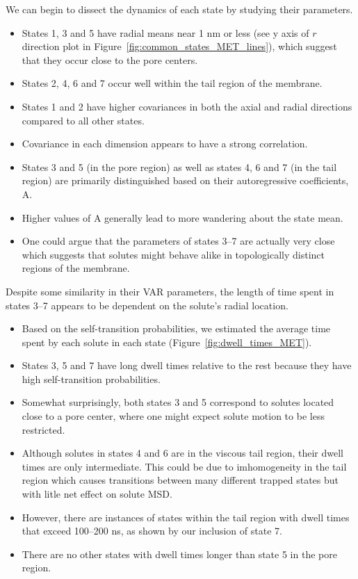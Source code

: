 \documentclass{article}
\begin{document}
  \noindent We can begin to dissect the dynamics of each state by studying their parameters.
  \begin{itemize}
    \item States 1, 3 and 5 have radial means near 1 nm or less (see y axis of $r$ direction plot in
    Figure~\ref{fig:common_states_MET_lines}), which suggest that they occur
    close to the pore centers. 
    \item States 2, 4, 6 and 7 occur well within the tail region of the membrane.
    \item States 1 and 2 have higher covariances in both the axial and radial
    directions compared to all other states.
    \item Covariance in each dimension appears to have a strong correlation.
    \item States 3 and 5 (in the pore region) as well as states 4, 6 and 7 (in the tail region) are primarily distinguished based
    on their autoregressive coefficients, A. 
    \item Higher values of A generally lead to more wandering about the state mean.
    \item One could argue that the parameters of states 3--7 are actually very close which
    suggests that solutes might behave alike in topologically distinct regions of the 
    membrane.
  \end{itemize}

  Despite some similarity in their VAR parameters, the length of time spent in states 3--7 
  appears to be dependent on the solute's radial location.
  \begin{itemize}
    \item Based on the self-transition probabilities, we estimated the average time
    spent by each solute in each state (Figure~\ref{fig:dwell_times_MET}).
    \item States 3, 5 and 7 have long dwell times relative to the rest because
    they have high self-transition probabilities.
    \item Somewhat surprisingly, both states 3 and 5 correspond to solutes located close to
    a pore center, where one might expect solute motion to be less restricted.
    \item Although solutes in states 4 and 6 are in the viscous tail region, their
    dwell times are only intermediate. This could be due to imhomogeneity in the
    tail region which causes transitions between many different trapped states but
    with litle net effect on solute MSD. 
    \item However, there are instances of states within the tail region with dwell 
    times that exceed 100--200 ns, as shown by our inclusion of state 7.
    \item There are no other states with dwell times longer than state 5 in the pore 
    region.
  \end{itemize} 
  
\end{document}
